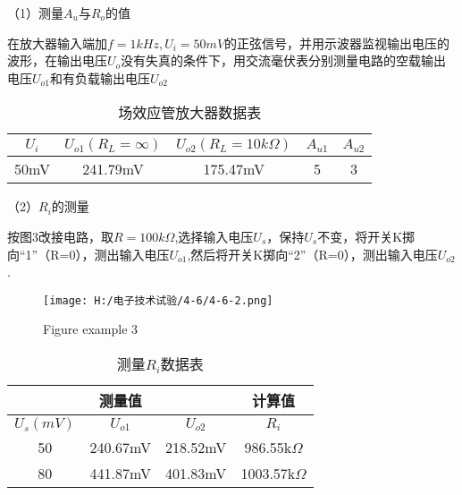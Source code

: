 \documentclass{article}
\begin{document}
（1）测量$A_u$与$R_o$的值\par
在放大器输入端加$f=1kHz,U_i=50mV$的正弦信号，并用示波器监视输出电压的波形，在输出电压$U_o$没有失真的条件下，用交流毫伏表分别测量电路的空载输出电压$U_{o1}$和有负载输出电压$U_{o2}$
\begin{table}[h]
	\centering  
	\begin{tabular}{c|c|c|c|c}
		\hline
	        $U_i$  &  $U_{o1}(R_L=\infty)$    & $U_{o2}(R_L=10k\Omega)$     & $A_{u1}$ & $A_{u2}$        \\ \hline
		    50mV &  241.79mV   & 175.47mV    &5    &3    \\   \hline
	\end{tabular}
	\caption{场效应管放大器数据表}\label{SIGN}
	\end{table}
（2）$R_i$的测量\par
按图3改接电路，取$R=100k\Omega$,选择输入电压$U_s$，保持$U_s$不变，将开关K掷向“1”（R=0），测出输入电压$U_{o1}$,然后将开关K掷向“2”（R=0），测出输入电压$U_{o2}$.
\begin{figure}[h]
	\centering
	\texttt{[image: H:/电子技术试验/4-6/4-6-2.png]}
	\caption{Figure example 3} \label{fig:aa}
\end{figure}
\begin{table}[h]
	\centering  
	\begin{tabular}{c|c|c|c}
		\hline
	        \multicolumn{3}{c}{测量值} \vline    &  \multicolumn{1}{c}{计算值} \\\hline
		    $U_s(mV)$  &  $U_{o1}$    & $U_{o2}$     & $R_i$    \\ \hline
		    50         &  240.67mV   & 218.52mV    &986.55k$\Omega$    \\   \hline
			80         &  441.87mV   & 401.83mV    &1003.57k$\Omega$     \\   \hline
	\end{tabular}
	\caption{测量$R_i$数据表}\label{SIGN}
	\end{table}
\end{document}
